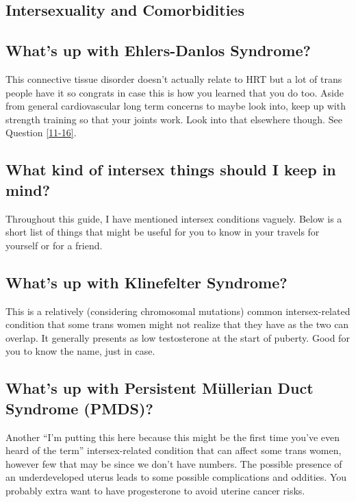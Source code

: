 \documentclass{article}
\begin{document}
\subsection*{Intersexuality and Comorbidities}

\subsection{What’s up with Ehlers-Danlos Syndrome?}

This connective tissue disorder doesn’t actually relate to HRT but a lot of trans people have it so congrats in case this is how you learned that you do too. Aside from general cardiovascular long term concerns to maybe look into, keep up with strength training so that your joints work. Look into that elsewhere though. See Question \ref{11-16}.

\subsection{What kind of intersex things should I keep in mind?}

Throughout this guide, I have mentioned intersex conditions vaguely. Below is a short list of things that might be useful for you to know in your travels for yourself or for a friend. 

\subsection{What’s up with Klinefelter Syndrome?}

This is a relatively (considering chromosomal mutations) common intersex-related condition that some trans women might not realize that they have as the two can overlap. It generally presents as low testosterone at the start of puberty. Good for you to know the name, just in case.

\subsection{What’s up with Persistent Müllerian Duct Syndrome (PMDS)?}

Another “I’m putting this here because this might be the first time you’ve even heard of the term” intersex-related condition that can affect some trans women, however few that may be since we don’t have numbers. The possible presence of an underdeveloped uterus leads to some possible complications and oddities. You probably extra want to have progesterone to avoid uterine cancer risks.
\end{document}
